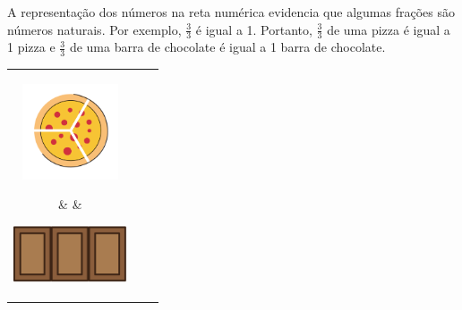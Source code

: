 \begin{center}
\end{center}

A representação dos números na reta numérica evidencia que algumas frações são números naturais. Por exemplo, $\frac{3}{3}$ é igual a 1. Portanto, $\frac{3}{3}$ de uma pizza é igual a 1 pizza e $\frac{3}{3}$ de uma barra de chocolate é igual a 1 barra de chocolate. 

\begin{center}
\begin{tabular}{ccc}
\parbox[100pt]{100pt}{\centering\includegraphics[width=80pt, keepaspectratio]{../figuras/licao03/orgideias_fig_a.png}}  & \quad & 
\parbox[100pt]{100pt}{\centering\vfill\includegraphics[width=95pt, keepaspectratio]{../figuras/licao03/orgideias_fig_b.png}
}
 \\
  {
  }
\end{tabular}
\end{center}

